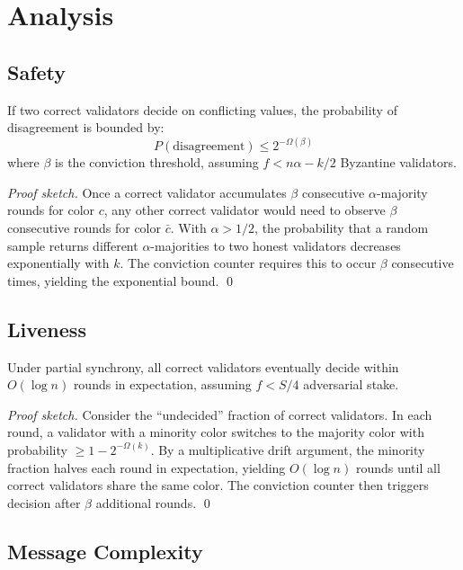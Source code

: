 \section{Analysis}
\label{sec:analysis}

\subsection{Safety}

\begin{theorem}[Safety]
If two correct validators decide on conflicting values, the probability of disagreement is bounded by:
\begin{equation}
    P(\text{disagreement}) \leq 2^{-\Omega(\beta)}
\end{equation}
where $\beta$ is the conviction threshold, assuming $f < n\alpha - k/2$ Byzantine validators.
\end{theorem}

\textit{Proof sketch.} Once a correct validator accumulates $\beta$ consecutive $\alpha$-majority rounds for color $c$, any other correct validator would need to observe $\beta$ consecutive rounds for color $\bar{c}$. With $\alpha > 1/2$, the probability that a random sample returns different $\alpha$-majorities to two honest validators decreases exponentially with $k$. The conviction counter requires this to occur $\beta$ consecutive times, yielding the exponential bound. \qed

\subsection{Liveness}

\begin{theorem}[Liveness]
Under partial synchrony, all correct validators eventually decide within $O(\log n)$ rounds in expectation, assuming $f < S/4$ adversarial stake.
\end{theorem}

\textit{Proof sketch.} Consider the ``undecided'' fraction of correct validators. In each round, a validator with a minority color switches to the majority color with probability $\geq 1 - 2^{-\Omega(k)}$. By a multiplicative drift argument, the minority fraction halves each round in expectation, yielding $O(\log n)$ rounds until all correct validators share the same color. The conviction counter then triggers decision after $\beta$ additional rounds. \qed

\subsection{Message Complexity}

